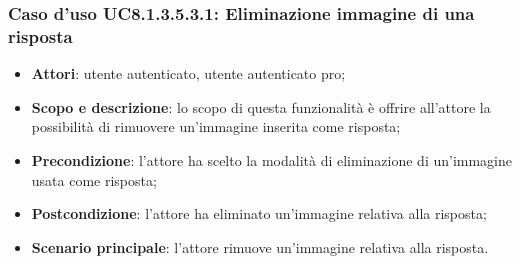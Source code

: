 \subsubsection{Caso d’uso UC8.1.3.5.3.1: Eliminazione immagine di una risposta}
\begin{itemize}
	\item\textbf{Attori}: utente autenticato, utente autenticato pro;
	\item\textbf{Scopo e descrizione}: lo scopo di questa funzionalità è offrire all'attore  la possibilità di rimuovere un'immagine inserita come risposta;
	\item\textbf{Precondizione}: l'attore ha scelto la modalità di eliminazione di un'immagine usata come risposta; 
	\item \textbf{Postcondizione}: l'attore ha eliminato un'immagine relativa alla risposta;
	\item\textbf{Scenario principale}: l'attore rimuove un'immagine relativa alla risposta. 
\end{itemize}